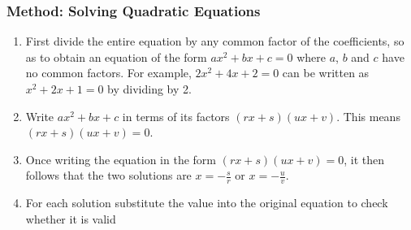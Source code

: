             \subsubsection{ Method: Solving Quadratic Equations}
            \nopagebreak
            
        
        \label{m39247*id150020}\begin{enumerate}[noitemsep, label=\textbf{\arabic*}. ] 
            \label{m39247*uid37}\item First divide the entire equation by any common factor of the coefficients,
so as to obtain an equation of the form \begin{math}a{x}^{2}+bx+c=0\end{math} where \begin{math}a\end{math}, \begin{math}b\end{math} and
\begin{math}c\end{math} have no common factors. For example, \begin{math}2{x}^{2}+4x+2=0\end{math}\hspace{1ex} can be written as
\begin{math}{x}^{2}+2x+1=0\end{math}\hspace{1ex} by dividing by 2.
\label{m39247*uid38}\item Write \begin{math}a{x}^{2}+bx+c\end{math} in terms of its factors \begin{math}\left(rx+s\right)\left(ux+v\right)\end{math}.
This means \begin{math}\left(rx+s\right)\left(ux+v\right)=0\end{math}.
\label{m39247*uid39}\item Once writing the equation in the form \begin{math}\left(rx+s\right)\left(ux+v\right)=0\end{math}, it then
follows that the two solutions are \begin{math}x=-\frac{s}{r}\end{math} or \begin{math}x=-\frac{u}{v}\end{math}.
\item For each solution substitute the value into the original equation to check whether it is valid\end{enumerate}
        
